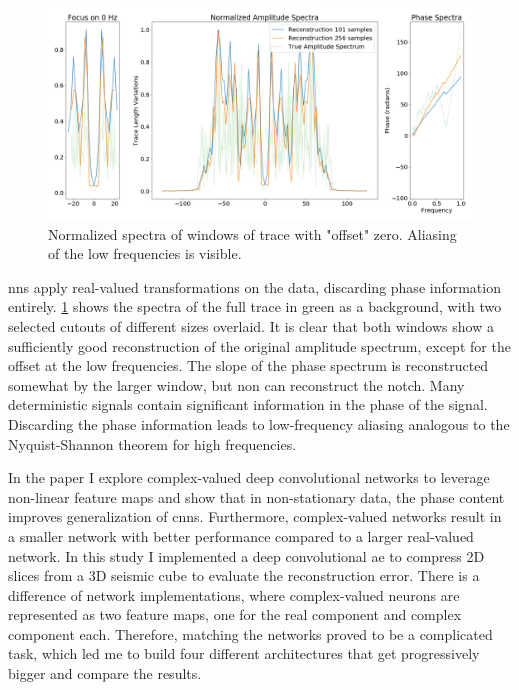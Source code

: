\begin{figure}
    \centering
    \includegraphics[width=\textwidth]{figures/information-windowing.png}
    \caption{Normalized spectra of windows of trace with "offset" zero. Aliasing of the low frequencies is visible.}
    \label{fig:seismic-window}
\end{figure}

\aclp{nn} apply real-valued transformations on the data, discarding phase information entirely. \cref{fig:seismic-window} shows the spectra of the full trace in green as a background, with two selected cutouts of different sizes overlaid. It is clear that both windows show a sufficiently good reconstruction of the original amplitude spectrum, except for the offset at the low frequencies. The slope of the phase spectrum is reconstructed somewhat by the larger window, but non can reconstruct the notch. Many deterministic signals contain significant information in the phase of the signal. Discarding the phase information leads to low-frequency aliasing analogous to the Nyquist-Shannon theorem for high frequencies.

In the paper  I explore complex-valued deep convolutional networks to leverage non-linear feature maps and show that in non-stationary data, the phase content improves generalization of \acp{cnn}. Furthermore, complex-valued networks result in a smaller network with better performance compared to a larger real-valued network. In this study I implemented a deep convolutional \acl{ae} to compress 2D slices from a 3D seismic cube to evaluate the reconstruction error. There is a difference of network implementations, where complex-valued neurons are represented as two feature maps, one for the real component and complex component each. Therefore, matching the networks proved to be a complicated task, which led me to build four different architectures that get progressively bigger and compare the results.

